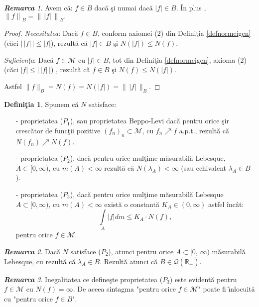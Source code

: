 \documentclass[ a4paper, 12pt]{report}
\theoremstyle{definition}
\newtheorem{definition}{\bf Defini\c tia}[section]
\theoremstyle{remark}
\newtheorem{remarc}{\bf Remarca}[section]
\numberwithin{equation}{section}
\begin{document}
\begin{remarc}
Avem c\u a: $f \in B$ dac\u a \c si numai dac\u a $\lvert f \rvert \in B$. \^In plus , ${\lVert f \rVert}_B = {\lVert\, |f| \, \rVert}_B.$
\end{remarc}
\begin{proof} {\it Necesitatea}: Dac\u a $f \in B$, conform axiomei ($2$) din Defini\c tia \ref{defnormeigen} (c\u aci $\big|\, |f|\, \big| \leq |f|$), rezult\u a c\u a $\lvert f \rvert \in B$ \c si $N(\lvert f \rvert) \leq N(f)$.

{\it Suficien\c ta}: Dac\u a $f \in \mathcal{M}$ cu $|f| \in B$, tot din Defini\c tia \ref{defnormeigen}, axioma ($2$) (c\u aci $|f| \leq \big|\, |f|\, \big|$) , rezult\u a c\u a $f \in B$ \c si $N(f) \leq N(|f|)$.

Astfel $\lVert f \rVert_B = N(f) = N(|f|) = \lVert\, |f| \, \rVert_B$.
\end{proof}

\begin{definition}
Spunem c\u a $N$ satisface:
\begin{itemize}
\item[-] proprietatea ($P_1$), sau proprietatea Beppo-Levi dac\u a pentru orice \c sir cresc\u ator de func\c tii pozitive $(f_n)_n \subset \mathcal{M}$, cu $f_n \nearrow f$ a.p.t., rezult\u a c\u a  $N(f_n) \nearrow N(f)$.

\item[-] proprietatea ($P_2$), dac\u a pentru orice mul\c time m\u asurabil\u a Lebesque, $A \subset [0, \infty)$, cu $m(A)<\infty$  rezult\u a c\u a $N(\lambda_A)<\infty$ (sau echivalent $\lambda_A \in B$).

\item[-] proprietatea ($P_3$), dac\u a pentru orice mul\c time m\u asurabil\u a Lebesque $A \subset [0, \infty)$, cu $m(A)<\infty$  exist\u a o constant\u a $K_A \in (0,\infty)$ astfel \^inc\^at:
$$\int\limits_{A} \lvert f \rvert dm \leq K_A \cdot N(f),$$ pentru orice $f \in \mathcal{M}$.
\end{itemize}
\end{definition}

\begin{remarc}
Dac\u a $N$ satisface ($P_2$), atunci pentru orice $A \subset [0, \, \infty)$ m\u asurabil\u a Lebesque, cu rezult\u a c\u a $\lambda_A \in B$. Rezult\u a atunci c\u a $B \in \mathcal{Q}(\mathbb{R}_+)$.
\end{remarc}

\begin{remarc}
Inegalitatea ce define\c ste proprietatea ($P_3$) este evident\u a pentru $f \in \mathcal{M}$ cu $N(f)=\infty$. De aceea sintagma "pentru orice $f \in \mathcal{M}$" poate fi \^\i nlocuit\u a cu "pentru orice $f \in B$".
\end{remarc}
\end{document}
